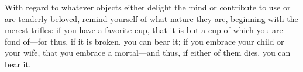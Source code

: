 With regard to whatever objects either delight the mind or contribute to
use or are tenderly beloved, remind yourself of what nature they are,
beginning with the merest trifles: if you have a favorite cup, that it is
but a cup of which you are fond of---for thus, if it is broken, you can
bear it; if you embrace your child or your wife, that you embrace a
mortal---and thus, if either of them dies, you can bear it.

